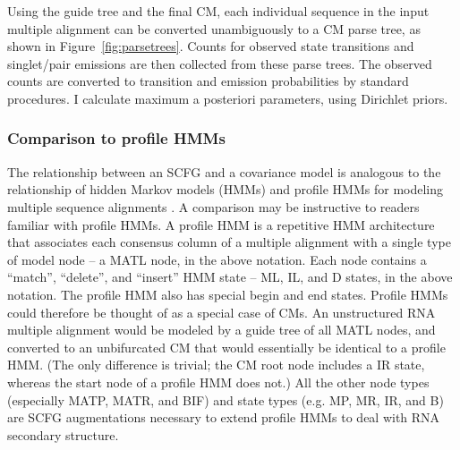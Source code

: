 \documentclass[11pt]{article}
\newif\ifdraft
\begin{document}
Using the guide tree and the final CM, each individual sequence in the
input multiple alignment can be converted unambiguously to a CM parse
tree, as shown in Figure~\ref{fig:parsetrees}. Counts for observed
state transitions and singlet/pair emissions are then collected from
these parse trees. The observed counts are converted to transition and
emission probabilities by standard procedures. I calculate maximum a
posteriori parameters, using Dirichlet priors.

\ifdraft
\begin{figure}[t]
\begin{center}
\texttt{[image: Figures/parsetrees]}
\end{center}
\caption{\textbf{Example parse trees.} Parse trees are shown for the
three sequences/structures from Figure~\ref{fig:input_alignment},
given the CM in Figure~\ref{fig:cm_graph}. For each sequence, each
residue must be associated with a state in the parse tree. (The
sequences can be read off its parse tree by starting at the upper left
and reading counterclockwise around the edge of parse tree.) Each
parse tree corresponds directly to a secondary structure -- base pairs
are pairs of residues aligned to MP states. A collection of parse
trees also corresponds to a multiple alignment, by aligning residues
that are associated with the same state -- for example, all three
trees have a residue aligned to state ML4, so these three residues
would be aligned together. Insertions and deletions relative to the
consensus use nonconsensus states, shown in gray.}
\label{fig:parsetrees}
\end{figure}
\fi

\subsubsection{Comparison to profile HMMs}

The relationship between an SCFG and a covariance model is analogous
to the relationship of hidden Markov models (HMMs) and profile HMMs
for modeling multiple sequence alignments
\cite{Krogh94,Durbin98,Eddy98}. A comparison may be instructive to
readers familiar with profile HMMs.  A profile HMM is a repetitive HMM
architecture that associates each consensus column of a multiple
alignment with a single type of model node -- a MATL node, in the
above notation. Each node contains a ``match'', ``delete'', and
``insert'' HMM state -- ML, IL, and D states, in the above notation.
The profile HMM also has special begin and end states. Profile HMMs
could therefore be thought of as a special case of CMs. An
unstructured RNA multiple alignment would be modeled by a guide tree
of all MATL nodes, and converted to an unbifurcated CM that would
essentially be identical to a profile HMM. (The only difference is
trivial; the CM root node includes a IR state, whereas the start node
of a profile HMM does not.) All the other node types (especially MATP,
MATR, and BIF) and state types (e.g. MP, MR, IR, and B) are SCFG
augmentations necessary to extend profile HMMs to deal with RNA
secondary structure.
\end{document}
